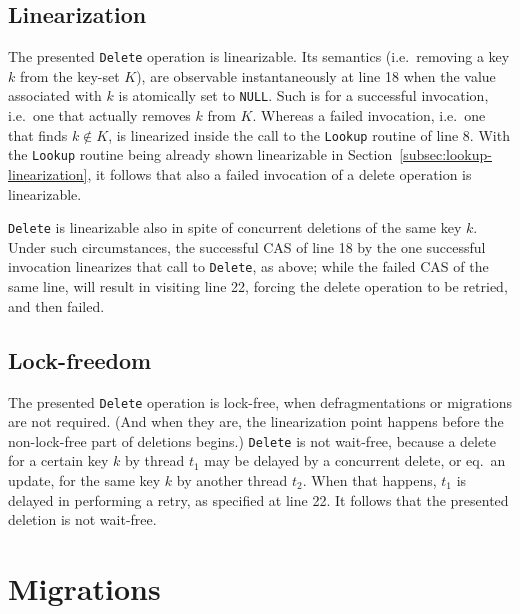 \subsection{Linearization}\label{subsec:delete-linearization}

The presented \texttt{Delete} operation is linearizable.
Its semantics (i.e.\ removing a key $k$ from the key-set $K$), are observable instantaneously at line 18 when the value associated with $k$ is atomically set to \texttt{NULL}.
Such is for a successful invocation, i.e.\ one that actually removes $k$ from $K$.
Whereas a failed invocation, i.e.\ one that finds $k \not\in K$, is linearized inside the call to the \texttt{Lookup} routine of line 8.
With the \texttt{Lookup} routine being already shown linearizable in Section~\ref{subsec:lookup-linearization}, it follows that also a failed invocation of a delete operation is linearizable.

\texttt{Delete} is linearizable also in spite of concurrent deletions of the same key $k$.
Under such circumstances, the successful CAS of line 18 by the one successful invocation linearizes that call to \texttt{Delete}, as above; while the failed CAS of the same line, will result in visiting line 22, forcing the delete operation to be retried, and then failed.

\subsection{Lock-freedom}\label{subsec:delete-lock-freedom}

The presented \texttt{Delete} operation is lock-free, when defragmentations or migrations are not required.
(And when they are, the linearization point happens before the non-lock-free part of deletions begins.)
\texttt{Delete} is not wait-free, because a delete for a certain key $k$ by thread $t_1$ may be delayed by a concurrent delete, or eq.\ an update, for the same key $k$ by another thread $t_2$.
When that happens, $t_1$ is delayed in performing a retry, as specified at line 22.
It follows that the presented deletion is not wait-free.




\section{Migrations}\label{sec:migrations}

